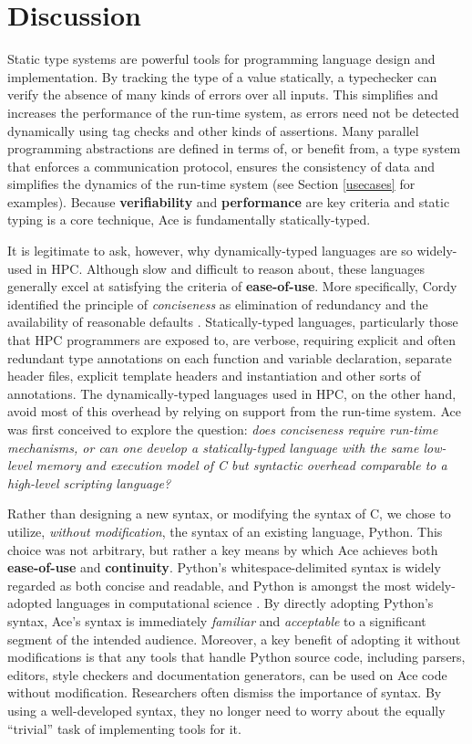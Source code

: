 \documentclass[9pt,preprint]{sigplanconf}
\begin{document}
\section{Discussion}\label{discussion}
Static type systems are powerful tools for programming language design and implementation. By tracking the type of a value statically, a typechecker can verify the absence of many kinds of errors over all inputs. This simplifies and increases the performance of the run-time system, as errors need not be detected dynamically using tag checks and other kinds of assertions. Many parallel programming abstractions are defined in terms of, or benefit from, a type system that enforces a communication protocol, ensures the consistency of data and simplifies the dynamics of the run-time system (see Section \ref{usecases} for examples). Because \textbf{verifiability} and \textbf{performance} are key criteria and static typing is a core technique, Ace is fundamentally statically-typed.

It is legitimate to ask, however, why dynamically-typed languages are so widely-used in HPC. Although slow and difficult to reason about, these languages generally excel at satisfying the criteria of \textbf{ease-of-use}. More specifically, Cordy identified the principle of \emph{conciseness} as elimination of
redundancy and the availability of reasonable defaults \cite{cordy1992hints}. Statically-typed languages, particularly those that HPC programmers are exposed to, are verbose, requiring explicit and often redundant type annotations on each function and variable declaration, separate header files, explicit template headers and  instantiation and other sorts of annotations.  The dynamically-typed languages used in HPC, on the other hand, avoid most of this overhead by relying on support from the run-time system. Ace was first conceived to explore the question: \emph{does conciseness require run-time mechanisms, or can one develop a statically-typed language with the same low-level memory and execution model of C but syntactic overhead comparable to a high-level scripting language? }

Rather than designing a new syntax, or modifying the syntax of C, we chose to utilize, \emph{without modification}, the syntax of an existing language, Python. This choice was not arbitrary, but rather a key means by which Ace achieves both \textbf{ease-of-use} and \textbf{continuity}. Python's whitespace-delimited syntax is widely regarded as both concise and readable, and Python is amongst the most widely-adopted languages in computational science \cite{oliphant2007python}. By directly adopting Python's syntax, Ace's syntax is immediately \emph{familiar} and \emph{acceptable} to a significant segment of the intended audience. Moreover, a key benefit of adopting it without modifications is that any {tools} that handle Python source code, including parsers, editors, style checkers and documentation generators, can be used on Ace code without modification. Researchers often dismiss the importance of syntax. By using a well-developed syntax, they no longer need to worry about the equally ``trivial'' task of implementing tools for it.
\end{document}

